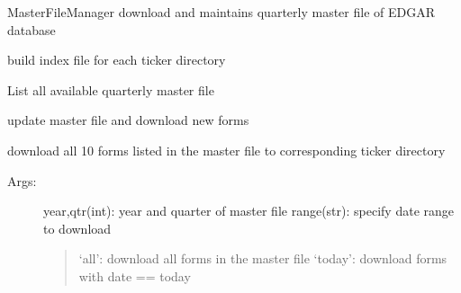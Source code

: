 \documentclass[letterpaper,10pt,english]{sphinxmanual}
\begin{document}

\begin{fulllineitems}
\label{form10DB:form10DB.Form10Manager}
MasterFileManager download and maintains quarterly master file of
EDGAR database

\begin{fulllineitems}
\label{form10DB:form10DB.Form10Manager.buildIndex}
build index file for each ticker directory

\end{fulllineitems}


\begin{fulllineitems}
\label{form10DB:form10DB.Form10Manager.listQuraterMasterFile}
List all available quarterly master file

\end{fulllineitems}


\begin{fulllineitems}
\label{form10DB:form10DB.Form10Manager.updateAndDownload}
update master file and download new forms

\end{fulllineitems}


\begin{fulllineitems}
\label{form10DB:form10DB.Form10Manager.updateForms}
download all 10 forms listed in the master file to corresponding ticker directory
\begin{description}
\item[{Args:}] \leavevmode
year,qtr(int):  year and quarter of master file
range(str):     specify date range to download
\begin{quote}

`all': download all forms in the master file
`today': download forms with date == today
\end{quote}


\end{description}
\end{fulllineitems}
\end{fulllineitems}
\end{document}

